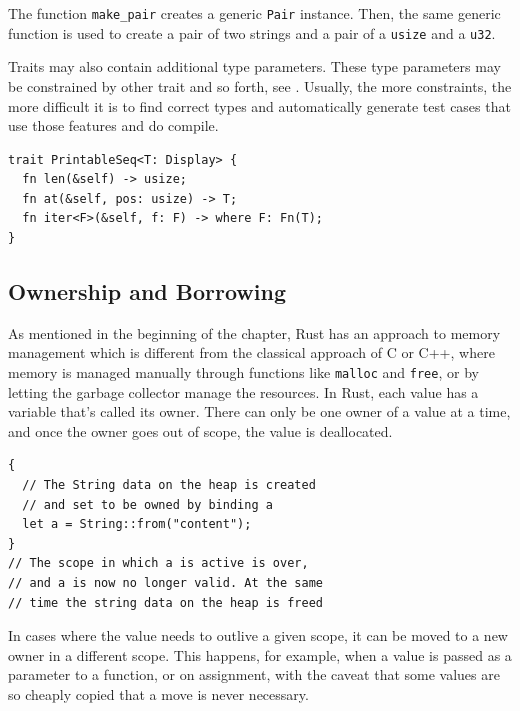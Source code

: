 \documentclass[paper=a4,%
  twoside,%
  BCOR4mm,%
  abstract=true,%
  toc=bibliography,%
  chapterprefix=true,%
  toc=bibliographynumbered,%
  open=right,%
  english,%
  pagesize=pdftex]{scrreprt}
\begin{document}
The function \texttt{make\string_pair} creates a generic \texttt{Pair} instance. Then, the same generic function is used to create a pair of two strings and a pair of a \texttt{usize} and a \texttt{u32}.

Traits may also contain additional type parameters. These type parameters may be constrained by other trait and so forth, see . Usually, the more constraints, the more difficult it is to find correct types and automatically generate test cases that use those features and do compile.

\begin{lstlisting}[style=boxed, caption={Type parameters can be specified for a trait to make it generic. These appear after the trait name, using the same syntax used in generic functions}, label=lst:traits-with-type-bounds]
trait PrintableSeq<T: Display> {
  fn len(&self) -> usize;
  fn at(&self, pos: usize) -> T;
  fn iter<F>(&self, f: F) -> where F: Fn(T);
}
\end{lstlisting}

\subsection{Ownership and Borrowing}
As mentioned in the beginning of the chapter, Rust has an approach to memory management which is different from the classical approach of C or C++, where memory is managed manually through functions like \texttt{malloc} and \texttt{free}, or by letting the garbage collector manage the resources. In Rust, each value has a variable that's called its owner. There can only be one owner of a value at a time, and once the owner goes out of scope, the value is deallocated.

\begin{lstlisting}[style=boxed, caption=Heap data owned by binding, label=lst:example-ownership]
{
  // The String data on the heap is created
  // and set to be owned by binding a
  let a = String::from("content");
}
// The scope in which a is active is over,
// and a is now no longer valid. At the same
// time the string data on the heap is freed
\end{lstlisting}

In cases where the value needs to outlive a given scope, it can be moved to a new owner in a different scope. This happens, for example, when a value is passed as a parameter to a function, or on assignment, with the caveat that some values are so cheaply copied that a move is never necessary.
\end{document}
